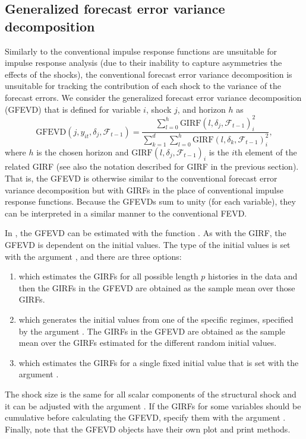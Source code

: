 \documentclass[nojss]{jss}
\begin{document}
\subsection{Generalized forecast error variance decomposition}
Similarly to the conventional impulse response functions are unsuitable for impulse response analysis (due to their inability to capture asymmetries the effects of the shocks), the conventional forecast error variance decomposition is unsuitable for tracking the contribution of each shock to the variance of the forecast errors. We consider the generalized forecast error variance decomposition (GFEVD) \citep{Lanne+Nyberg:2016}  that is defined for variable $i$, shock $j$, and horizon $h$ as
\begin{equation}
\text{GFEVD}(j,y_{it}, \delta_j,\mathcal{F}_{t-1}) = \frac{\sum_{l=0}^h\text{GIRF}(l,\delta_j,\mathcal{F}_{t-1})_i^2}{\sum_{k=1}^d\sum_{l=0}^h\text{GIRF}(l,\delta_k,\mathcal{F}_{t-1})_i^2},
\end{equation}
where $h$ is the chosen horizon and $\text{GIRF}(l,\delta_j,\mathcal{F}_{t-1})_i$ is the $i$th element of the related GIRF (see also the notation described for GIRF in the previous section). That is, the GFEVD is otherwise similar to the conventional forecast error variance decomposition but with GIRFs in the place of conventional impulse response functions. Because the GFEVDs sum to unity (for each variable), they can be interpreted in a similar manner to the conventional FEVD.

In , the GFEVD can be estimated with the function . As with the GIRF, the GFEVD is dependent on the initial values. The type of the initial values is set with the argument , and there are three options:
\begin{enumerate}
\item {} which estimates the GIRFs for all possible length $p$ histories in the data and then the GIRFs in the GFEVD are obtained as the sample mean over those GIRFs.
\item {} which generates the initial values from one of the specific regimes, specified by the argument . The GIRFs in the GFEVD are obtained as the sample mean over the GIRFs estimated for the different random initial values.
\item {} which estimates the GIRFs for a single fixed initial value that is set with the argument .
\end{enumerate}
The shock size is the same for all scalar components of the structural shock and it can be adjusted with the argument . If the GIRFs for some variables should be cumulative before calculating the GFEVD, specify them with the argument . Finally, note that the GFEVD objects have their own plot and print methods.
\end{document}
